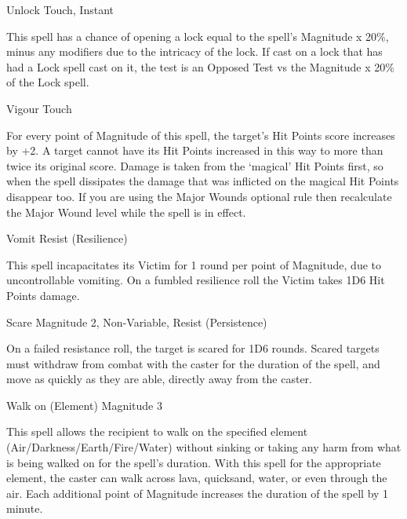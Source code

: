 \begin{rpg-spell}
{Unlock}
{Touch, Instant}

This spell has a chance of opening a lock equal to the spell’s Magnitude x 20\%, minus any modifiers due to the intricacy of the lock. If cast on a lock that has had a Lock spell cast on it, the test is an Opposed Test vs the Magnitude x 20\% of the Lock spell.
\end{rpg-spell}


\begin{rpg-spell}
{Vigour}
{Touch}

For every point of Magnitude of this spell, the target’s Hit Points score increases by +2. A target cannot have its Hit Points increased in this way to more than twice its original score. Damage is taken from the ‘magical’ Hit Points first, so when the spell dissipates the damage that was inflicted on the magical Hit Points disappear too.  If you are using the Major Wounds optional rule then recalculate the Major Wound level while the spell is in effect.
\end{rpg-spell}


\begin{rpg-spell}
{Vomit}
{Resist (Resilience)}

This spell incapacitates its Victim for 1 round per point of Magnitude, due to uncontrollable vomiting. On a fumbled resilience roll the Victim takes 1D6 Hit Points damage.
\end{rpg-spell}


\begin{rpg-spell}
{Scare}
{Magnitude 2, Non-Variable, Resist (Persistence)}

On a failed resistance roll, the target is scared for 1D6 rounds. Scared targets must withdraw from combat with the caster for the duration of the spell, and move as quickly as they are able, directly away from the caster.
\end{rpg-spell}


\begin{rpg-spell}
{Walk on (Element)}
{Magnitude 3}

This spell allows the recipient to walk on the specified element (Air/Darkness/Earth/Fire/Water) without sinking or taking any harm from what is being walked on for the spell’s duration. With this spell for the appropriate element, the caster can walk across lava, quicksand, water, or even through the air. Each additional point of Magnitude increases the duration of the spell by 1 minute.
\end{rpg-spell}


